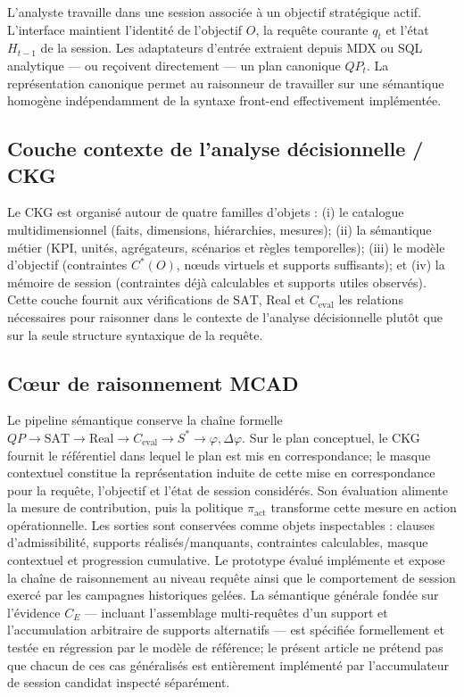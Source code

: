 \documentclass[journal]{IEEEtran}
\begin{document}
L'analyste travaille dans une session associée à un objectif stratégique actif. L'interface maintient l'identité de l'objectif $O$, la requête courante $q_t$ et l'état $H_{t-1}$ de la session. Les adaptateurs d'entrée extraient depuis MDX ou SQL analytique --- ou reçoivent directement --- un plan canonique $QP_t$. La représentation canonique permet au raisonneur de travailler sur une sémantique homogène indépendamment de la syntaxe front-end effectivement implémentée.

\subsection{Couche contexte de l'analyse décisionnelle / CKG}

Le CKG est organisé autour de quatre familles d'objets : (i) le catalogue multidimensionnel (faits, dimensions, hiérarchies, mesures); (ii) la sémantique métier (KPI, unités, agrégateurs, scénarios et règles temporelles); (iii) le modèle d'objectif (contraintes $C^*(O)$, nœuds virtuels et supports suffisants); et (iv) la mémoire de session (contraintes déjà calculables et supports utiles observés). Cette couche fournit aux vérifications de $\mathrm{SAT}$, $\mathrm{Real}$ et $C_{\mathrm{eval}}$ les relations nécessaires pour raisonner dans le contexte de l'analyse décisionnelle plutôt que sur la seule structure syntaxique de la requête.

\subsection{Cœur de raisonnement MCAD}

Le pipeline sémantique conserve la chaîne formelle $QP\rightarrow\mathrm{SAT}\rightarrow\mathrm{Real}\rightarrow C_{\mathrm{eval}}\rightarrow S^*\rightarrow\varphi,\Delta\varphi$. Sur le plan conceptuel, le CKG fournit le référentiel dans lequel le plan est mis en correspondance; le masque contextuel constitue la représentation induite de cette mise en correspondance pour la requête, l'objectif et l'état de session considérés. Son évaluation alimente la mesure de contribution, puis la politique $\pi_{\mathrm{act}}$ transforme cette mesure en action opérationnelle. Les sorties sont conservées comme objets inspectables : clauses d'admissibilité, supports réalisés/manquants, contraintes calculables, masque contextuel et progression cumulative. Le prototype évalué implémente et expose la chaîne de raisonnement au niveau requête ainsi que le comportement de session exercé par les campagnes historiques gelées. La sémantique générale fondée sur l'évidence $C_E$ --- incluant l'assemblage multi-requêtes d'un support et l'accumulation arbitraire de supports alternatifs --- est spécifiée formellement et testée en régression par le modèle de référence; le présent article ne prétend pas que chacun de ces cas généralisés est entièrement implémenté par l'accumulateur de session candidat inspecté séparément.
\end{document}
